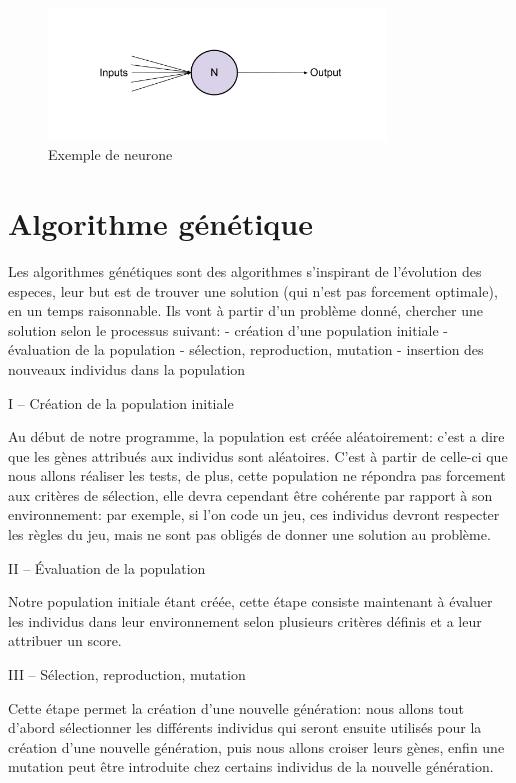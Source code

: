 \begin{figure}[H]
    \centering
    \includegraphics[width=0.8\textwidth]{./pictures/neurone.png}
    \caption{Exemple de neurone}
    \label{fig:awesome_image}
\end{figure}


\section{Algorithme génétique}
Les algorithmes génétiques sont des algorithmes s'inspirant de l'évolution des especes, leur but est de trouver une solution (qui n'est pas forcement optimale), en un temps raisonnable. Ils vont à partir d'un problème donné, chercher une solution selon le processus suivant: 
- création d'une population initiale
- évaluation de la population
- sélection, reproduction, mutation
- insertion des nouveaux individus dans la population

I – Création de la population initiale

	Au début de notre programme, la population est créée aléatoirement: c'est a dire que les gènes attribués aux individus sont aléatoires. C'est à partir de celle-ci que nous allons réaliser les tests, de plus, cette population ne répondra pas forcement aux critères de sélection, elle devra cependant être cohérente par rapport à son environnement: par exemple, si l'on code un jeu, ces individus devront respecter les règles du jeu, mais ne sont pas obligés de donner une solution au problème.

II – Évaluation de la population

	Notre population initiale étant créée, cette étape consiste maintenant à évaluer les individus dans leur environnement selon plusieurs critères définis et a leur attribuer un score.

III – Sélection, reproduction, mutation

	Cette étape permet la création d'une nouvelle génération: nous allons tout d'abord sélectionner les différents individus qui seront ensuite utilisés pour la création d'une nouvelle génération, puis nous allons croiser leurs gènes, enfin une mutation peut être introduite chez certains individus de la nouvelle génération.
 
